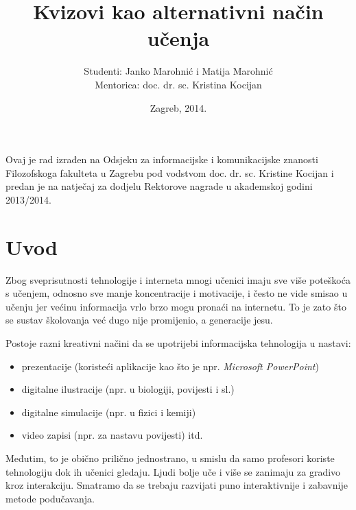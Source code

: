 \documentclass[11pt]{scrreprt}
\begin{document}
\titlehead{}
\title{Kvizovi kao alternativni način učenja}
\vfill
\author{Studenti: Janko Marohnić i Matija Marohnić\\Mentorica: doc. dr. sc. Kristina
Kocijan}
\date{Zagreb, 2014.}

\maketitle

\pagebreak

Ovaj je rad izrađen na Odsjeku za informacijske i komunikacijske znanosti
Filozofskoga fakulteta u Zagrebu pod vodstvom doc. dr. sc. Kristine Kocijan i
predan je na natječaj za dodjelu Rektorove nagrade u akademskoj godini
2013/2014.

\pagebreak

\tableofcontents

\chapter{Uvod}

Zbog sveprisutnosti tehnologije i interneta mnogi učenici imaju sve više
poteškoća s učenjem, odnosno sve manje koncentracije i motivacije, i često ne
vide smisao u učenju jer većinu informacija vrlo brzo mogu pronaći na internetu.
To je zato što se sustav školovanja već dugo nije promijenio, a generacije
jesu.\cite{perisic13}

Postoje razni kreativni načini da se upotrijebi informacijska tehnologija u
nastavi:

\begin{itemize}
  \item prezentacije (koristeći aplikacije kao što je npr. \emph{Microsoft
    PowerPoint})
  \item digitalne ilustracije (npr. u biologiji, povijesti i sl.)
  \item digitalne simulacije (npr. u fizici i kemiji)
  \item video zapisi (npr. za nastavu povijesti) itd.
\end{itemize}

Međutim, to je obično prilično jednostrano, u smislu da samo profesori koriste
tehnologiju dok ih učenici gledaju. Ljudi bolje uče i više se zanimaju za
gradivo kroz interakciju. Smatramo da se trebaju razvijati puno interaktivnije i
zabavnije metode podučavanja.
\end{document}
